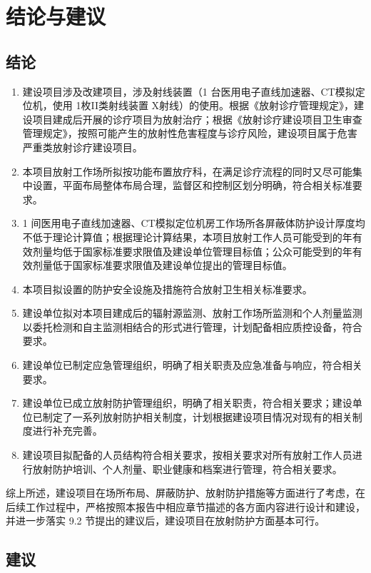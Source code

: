 \chapter{结论与建议}

\section{结论}

\begin{enumerate}
\item 建设项目涉及改建项目，涉及射线装置（1 台医用电子直线加速器、CT模拟定位机，使用 1枚II类射线装置 X射线）的使用。根据《放射诊疗管理规定》，建设项目建成后开展的诊疗项目为放射治疗；根据《放射诊疗建设项目卫生审查管理规定》，按照可能产生的放射性危害程度与诊疗风险，建设项目属于危害严重类放射诊疗建设项目。
\item 本项目放射工作场所拟按功能布置放疗科，在满足诊疗流程的同时又尽可能集中设置，平面布局整体布局合理，监督区和控制区划分明确，符合相关标准要求。
\item 1 间医用电子直线加速器、CT模拟定位机房工作场所各屏蔽体防护设计厚度均不低于理论计算值；根据理论计算结果，本项目放射工作人员可能受到的年有效剂量均低于国家标准要求限值及建设单位管理目标值；公众可能受到的年有效剂量低于国家标准要求限值及建设单位提出的管理目标值。
\item 本项目拟设置的防护安全设施及措施符合放射卫生相关标准要求。
\item 建设单位拟对本项目建成后的辐射源监测、放射工作场所监测和个人剂量监测以委托检测和自主监测相结合的形式进行管理，计划配备相应质控设备，符合要求。
\item 建设单位已制定应急管理组织，明确了相关职责及应急准备与响应，符合相关要求。
\item 建设单位已成立放射防护管理组织，明确了相关职责，符合相关要求；建设单位已制定了一系列放射防护相关制度，计划根据建设项目情况对现有的相关制度进行补充完善。
\item 建设项目拟配备的人员结构符合相关要求，按相关要求对所有放射工作人员进行放射防护培训、个人剂量、职业健康和档案进行管理，符合相关要求。
\end{enumerate}

综上所述，建设项目在场所布局、屏蔽防护、放射防护措施等方面进行了考虑，在后续工作过程中，严格按照本报告中相应章节描述的各方面内容进行设计和建设，并进一步落实 9.2 节提出的建议后，建设项目在放射防护方面基本可行。

\section{建议}

